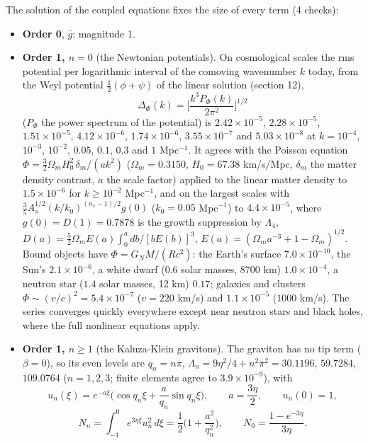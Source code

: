 \documentclass[
  10pt,
]{article}
\providecommand{\tightlist}{%
  \setlength{\itemsep}{0pt}\setlength{\parskip}{0pt}}
\begin{document}
The solution of the coupled equations fixes the size of every term (4
checks):

\begin{itemize}
\tightlist
\item
  \textbf{Order 0}, \(\bar g\): magnitude 1.
\item
  \textbf{Order 1, \(n = 0\)} (the Newtonian potentials). On
  cosmological scales the rms potential per logarithmic interval of the
  comoving wavenumber \(k\) today, from the Weyl potential
  \(\frac12(\phi + \psi)\) of the linear solution (section 12),
  \[ \Delta_\Phi(k) = \Big[\frac{k^3P_\Phi(k)}{2\pi^2}\Big]^{1/2} \]
  (\(P_\Phi\) the power spectrum of the potential) is
  \(2.42\times10^{-5}\), \(2.28\times10^{-5}\), \(1.51\times10^{-5}\),
  \(4.12\times10^{-6}\), \(1.74\times10^{-6}\), \(3.55\times10^{-7}\)
  and \(5.03\times10^{-8}\) at \(k = 10^{-4}\), \(10^{-3}\),
  \(10^{-2}\), \(0.05\), \(0.1\), \(0.3\) and \(1\) Mpc\(^{-1}\). It
  agrees with the Poisson equation
  \(\Phi = \frac32\Omega_mH_0^2\,\delta_m/(ak^2)\)
  (\(\Omega_m = 0.3150\), \(H_0 = 67.38\) km/s/Mpc, \(\delta_m\) the
  matter density contrast, \(a\) the scale factor) applied to the linear
  matter density to \(1.5\times10^{-6}\) for \(k \ge 10^{-2}\)
  Mpc\(^{-1}\), and on the largest scales with
  \(\frac35A_s^{1/2}(k/k_0)^{(n_s - 1)/2}g(0)\) (\(k_0 = 0.05\)
  Mpc\(^{-1}\)) to \(4.4\times10^{-5}\), where \(g(0) = D(1) = 0.7878\)
  is the growth suppression by \(\Lambda_4\),
  \(D(a) = \frac52\Omega_mE(a)\int_0^a db/[bE(b)]^3\),
  \(E(a) = (\Omega_ma^{-3} + 1 - \Omega_m)^{1/2}\). Bound objects have
  \(\Phi = G_NM/(Rc^2)\): the Earth's surface \(7.0\times10^{-10}\), the
  Sun's \(2.1\times10^{-6}\), a white dwarf (\(0.6\) solar masses, 8700
  km) \(1.0\times10^{-4}\), a neutron star (\(1.4\) solar masses, 12 km)
  \(0.17\); galaxies and clusters
  \(\Phi \sim (v/c)^2 = 5.4\times10^{-7}\) (\(v = 220\) km/s) and
  \(1.1\times10^{-5}\) (\(1000\) km/s). The series converges quickly
  everywhere except near neutron stars and black holes, where the full
  nonlinear equations apply.
\item
  \textbf{Order 1, \(n \ge 1\)} (the Kaluza-Klein gravitons). The
  graviton has no tip term (\(\beta = 0\)), so its even levels are
  \(q_n = n\pi\), \(\Lambda_n = 9\eta^2/4 + n^2\pi^2 = 30.1196\),
  \(59.7284\), \(109.0764\) (\(n = 1, 2, 3\); finite elements agree to
  \(3.9\times10^{-9}\)), with
  \[ u_n(\xi) = e^{-a\xi}\Big(\cos q_n\xi + \frac{a}{q_n}\sin q_n\xi\Big),\qquad a = \frac{3\eta}{2},\qquad u_n(0) = 1,\]
  \[ N_n = \int_{-1}^{0}e^{3\eta\xi}u_n^2\,d\xi = \frac12\Big(1 + \frac{a^2}{q_n^2}\Big),\qquad N_0 = \frac{1 - e^{-3\eta}}{3\eta} .\]

\end{itemize}
\end{document}
